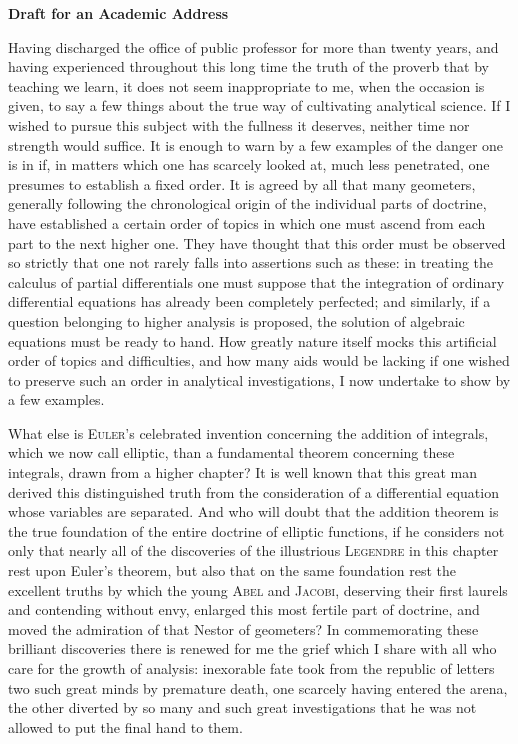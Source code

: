\documentclass[11pt]{article}
\newcommand{\scn}[1]{\textsc{#1}}
\begin{document}
\begin{center}
{\Large\bfseries Draft for an Academic Address\par}
\vspace{0.8em}
\end{center}

Having discharged the office of public professor for more than twenty years, and having experienced throughout this long time the truth of the proverb that by teaching we learn, it does not seem inappropriate to me, when the occasion is given, to say a few things about the true way of cultivating analytical science. If I wished to pursue this subject with the fullness it deserves, neither time nor strength would suffice. It is enough to warn by a few examples of the danger one is in if, in matters which one has scarcely looked at, much less penetrated, one presumes to establish a fixed order. It is agreed by all that many geometers, generally following the chronological origin of the individual parts of doctrine, have established a certain order of topics in which one must ascend from each part to the next higher one. They have thought that this order must be observed so strictly that one not rarely falls into assertions such as these: in treating the calculus of partial differentials one must suppose that the integration of ordinary differential equations has already been completely perfected; and similarly, if a question belonging to higher analysis is proposed, the solution of algebraic equations must be ready to hand. How greatly nature itself mocks this artificial order of topics and difficulties, and how many aids would be lacking if one wished to preserve such an order in analytical investigations, I now undertake to show by a few examples.

What else is \scn{Euler}'s celebrated invention concerning the addition of integrals, which we now call elliptic, than a fundamental theorem concerning these integrals, drawn from a higher chapter? It is well known that this great man derived this distinguished truth from the consideration of a differential equation whose variables are separated. And who will doubt that the addition theorem is the true foundation of the entire doctrine of elliptic functions, if he considers not only that nearly all of the discoveries of the illustrious \scn{Legendre} in this chapter rest upon Euler's theorem, but also that on the same foundation rest the excellent truths by which the young \scn{Abel} and \scn{Jacobi}, deserving their first laurels and contending without envy, enlarged this most fertile part of doctrine, and moved the admiration of that Nestor of geometers? In commemorating these brilliant discoveries there is renewed for me the grief which I share with all who care for the growth of analysis: inexorable fate took from the republic of letters two such great minds by premature death, one scarcely having entered the arena, the other diverted by so many and such great investigations that he was not allowed to put the final hand to them.
\end{document}
